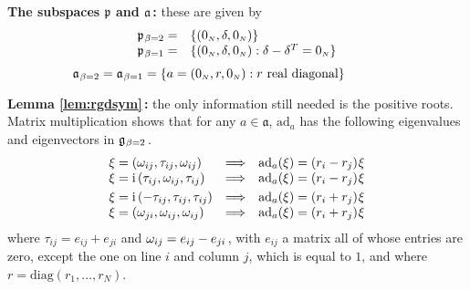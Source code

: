 \documentclass[draftclsnofoot]{IEEEtran}
\begin{document}
\noindent \textbf{The subspaces $\mathfrak{p}$ and $\mathfrak{a}$\,:} these are given by
$$
\begin{array}{rl}
\mathfrak{p}_{\hspace{0.02cm}\beta = 2} = & \lbrace (\mathrm{0}_{\scriptscriptstyle N},\delta,\mathrm{0}_{\scriptscriptstyle N}) \rbrace \\
\mathfrak{p}_{\hspace{0.02cm}\beta = 1} = & \lbrace (\mathrm{0}_{\scriptscriptstyle N},\delta,\mathrm{0}_{\scriptscriptstyle N}):  \delta - \delta^T = \mathrm{0}_{\scriptscriptstyle N}\rbrace
\end{array}
$$
$$
\mathfrak{a}_{\hspace{0.02cm}\beta = 2} = 
\mathfrak{a}_{\hspace{0.02cm}\beta = 1} = \lbrace a =  (\mathrm{0}_{\scriptscriptstyle N},r,\mathrm{0}_{\scriptscriptstyle N}): r \text{ real diagonal}\rbrace \hspace{1.5cm}\,
$$

\noindent \textbf{Lemma \ref{lem:rgdsym}\,:} the only information still needed is the positive roots. Matrix multiplication shows that for any $a \in \mathfrak{a}$, $\mathrm{ad}_a$ has the following eigenvalues and eigenvectors in $\mathfrak{g}_{\hspace{0.02cm}\beta = 2}\hspace{0.03cm}$.
$$
\begin{array}{lcl}
\xi = \left(\omega_{ij},\tau_{ij},\omega_{ij}\right) & \Longrightarrow & \mathrm{ad}_a(\xi) = (r_i - r_j)\hspace{0.02cm}\xi\\
\xi = \mathrm{i}\left(\tau_{ij},\omega_{ij},\tau_{ij}\right) & \Longrightarrow & \mathrm{ad}_a(\xi) = (r_i - r_j)\hspace{0.02cm}\xi
\\[0.1cm]
\xi = \mathrm{i}\left(-\tau_{ij},\tau_{ij},\tau_{ij}\right) & \Longrightarrow & \mathrm{ad}_a(\xi) = (r_i + r_j)\hspace{0.02cm}\xi \\ 
\xi = \left(\omega_{ji},\omega_{ij},\omega_{ij}\right) & \Longrightarrow & \mathrm{ad}_a(\xi) = (r_i + r_j)\hspace{0.02cm}\xi
\end{array}
$$
where $\tau_{ij} = e_{ij} + e_{ji}$ and $\omega_{ij} = e_{ij} - e_{ji}\hspace{0.03cm}$, with $e_{ij}$ a matrix all of whose entries are zero, except the one on line $i$ and column $j$, which is equal to $1$, and where $r = \mathrm{diag}(r_{\scriptscriptstyle 1},\ldots,r_{\scriptscriptstyle N})$. 
\end{document}
